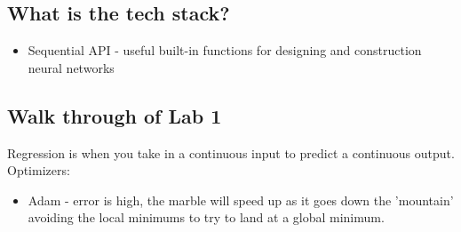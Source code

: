 \documentclass{article}
\begin{document}
\subsection{What is the tech stack?}
\begin{itemize}
    \item Sequential API - useful built-in functions for designing and construction neural networks
\end{itemize}
\subsection{Walk through of Lab 1}
Regression is when you take in a continuous input to predict a continuous output. 
Optimizers:
\begin{itemize}
    \item Adam - error is high, the marble will speed up as it goes down the 'mountain' avoiding the local minimums to try to land at a global minimum.
\end{itemize}
\end{document}
